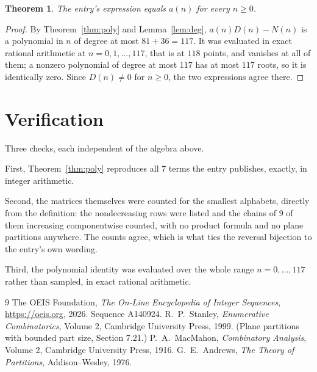 \documentclass[11pt,a4paper]{article}
\theoremstyle{plain}
\newtheorem{theorem}{Theorem}
\theoremstyle{definition}
\begin{document}
\begin{theorem}
The entry's expression equals $a(n)$ for every $n\ge0$.
\end{theorem}

\begin{proof}
By Theorem~\ref{thm:poly} and Lemma~\ref{lem:deg}, $a(n)D(n)-N(n)$ is a polynomial in $n$
of degree at most $81+36=117$. It was evaluated in exact rational arithmetic at
$n=0,1,\dots,117$, that is at $118$ points, and vanishes at all of them; a nonzero polynomial
of degree at most $117$ has at most $117$ roots, so it is identically zero. Since $D(n)\neq0$
for $n\ge0$, the two expressions agree there.
\end{proof}

\section{Verification}

Three checks, each independent of the algebra above.

First, Theorem~\ref{thm:poly} reproduces all $7$ terms the entry publishes,
exactly, in integer arithmetic.

Second, the matrices themselves were counted for the smallest alphabets, directly from the
definition: the nondecreasing rows were listed and the chains of $9$ of them increasing
componentwise counted, with no product formula and no plane partitions anywhere. The counts
agree, which is what ties the reversal bijection to the entry's own wording.

Third, the polynomial identity was evaluated over the whole range $n=0,\dots,117$ rather than
sampled, in exact rational arithmetic.

\begin{thebibliography}{9}
 The OEIS Foundation, \emph{The On-Line Encyclopedia of Integer
Sequences}, \url{https://oeis.org}, 2026. Sequence A140924.
 R.~P.~Stanley, \emph{Enumerative Combinatorics}, Volume 2, Cambridge
University Press, 1999. (Plane partitions with bounded part size, Section 7.21.)
 P.~A.~MacMahon, \emph{Combinatory Analysis}, Volume 2, Cambridge
University Press, 1916.
 G.~E.~Andrews, \emph{The Theory of Partitions}, Addison--Wesley, 1976.
\end{thebibliography}
\end{document}
